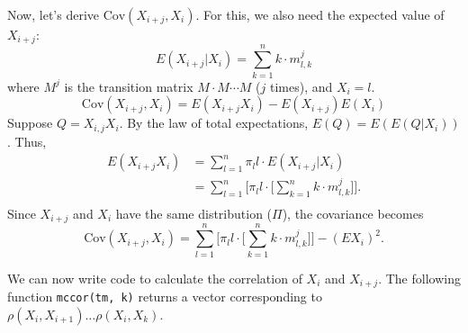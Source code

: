 \documentclass[12pt]{article}
\begin{document}
Now, let's derive $\text{Cov}(X_{i+j}, X_i)$. For this, we also need the expected
value of $X_{i+j}$:
$$ E(X_{i+j} | X_i) = \sum_{k=1}^n{k \cdot m^j_{l,k}} $$
where $M^j$ is the transition matrix $M \cdot M \cdots M$ ($j$ times), and 
$X_i = l$. 
$$ \text{Cov}(X_{i+j}, X_i) = E(X_{i+j}X_i) - E(X_{i+j})E(X_i) $$
Suppose $Q = X_{i,j}X_i$. By the law of total expectations, $ E(Q) = E(E(Q|X_i))$.
Thus, 
\begin{equation*}
  \begin{aligned}
    E(X_{i+j}X_i) &= \sum_{l=1}^n{ \pi_l l \cdot E(X_{i+j} | X_i)} \\
                  &= \sum_{l=1}^n{ \Bigg[ \pi_l l \cdot \Big[ 
                         \sum_{k=1}^n{k \cdot m^j_{l,k}} \Big]} \Bigg]. \\
  \end{aligned}
\end{equation*}
Since $X_{i+j}$ and $X_i$ have the same distribution ($\Pi$), the covariance becomes
$$ \text{Cov}(X_{i+j}, X_i) =  \sum_{l=1}^n{ \Bigg[ \pi_l l \cdot \Big[ 
                                     \sum_{k=1}^n{k \cdot m^j_{l,k}} \Big]} \Bigg]
                              - (EX_i)^2.$$

We can now write code to calculate the correlation of $X_i$ and $X_{i+j}$. The following
function \texttt{mccor(tm, k)} returns a vector corresponding to 
$\rho(X_i, X_{i+1}) \dots \rho(X_i, X_k)$. 

\lstset{
  basicstyle=\small,
  stringstyle=\ttfamily,
  numbers=left,
  numberstyle=\tiny,
  stepnumber=1, 
  numbersep=5pt,
  language=R }


\end{document}

